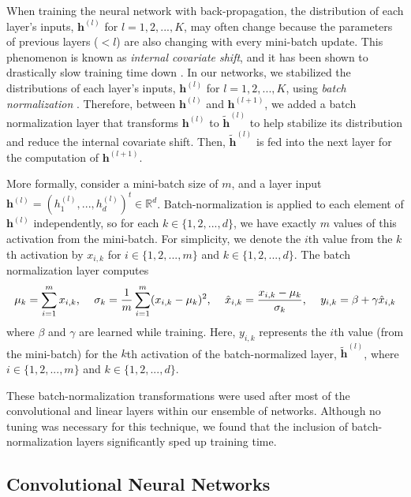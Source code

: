 \documentclass [MAS] {uclathes}
\begin{document}
When training the neural network with back-propagation, the distribution of each layer's inputs, $\mathbf{h}^{(l)}$ for $l=1, 2, ..., K$, may often change because the parameters of previous layers ($< l$) are also changing with every mini-batch update. This phenomenon is known as \textit{internal covariate shift}, and it has been shown to drastically slow training time down \cite{BatchNorm}. In our networks, we stabilized the distributions of each layer's inputs, $\mathbf{h}^{(l)}$ for $l=1, 2, ..., K$, using \textit{batch normalization} \cite{BatchNorm}. Therefore, between $\mathbf h^{(l)}$ and $\mathbf h^{(l+1)}$, we added a batch normalization layer that transforms $\mathbf{h}^{(l)}$ to $\tilde{\mathbf{h}}^{(l)}$ to help stabilize its distribution and reduce the internal covariate shift. Then, $\tilde{\mathbf{h}}^{(l)}$ is fed into the next layer for the computation of $\mathbf{h}^{(l+1)}$. 

More formally, consider a mini-batch size of $m$, and a layer input $\mathbf{h}^{(l)} = (h^{(l)}_1, ..., h^{(l)}_d)^t \in \mathbb{R}^d$. Batch-normalization is applied to each element of $\mathbf{h}^{(l)}$ independently, so for each $k \in \{1, 2, ..., d \}$, we have exactly $m$ values of this activation from the mini-batch. For simplicity, we denote the $i$th value from the $k$th activation by $x_{i,k}$ for $i \in \{1, 2, ..., m \}$ and $k \in \{1, 2, ..., d \}$. The batch normalization layer computes $$\mu_k = \sum_{i=1}^{m} x_{i, k} \text{, \quad} \sigma_k = \frac{1}{m} \sum_{i=1}^{m} (x_{i, k} - \mu_k)^2 \text{, \quad} \hat{x}_{i,k} = \frac{x_{i,k} - \mu_k}{\sigma_k} \text{, \quad} y_{i, k} = \beta + \gamma \hat{x}_{i,k}$$ where $\beta$ and $\gamma$ are learned while training. Here, $y_{i, k}$ represents the $i$th value (from the mini-batch) for the $k$th activation of the batch-normalized layer, $\tilde{\mathbf{h}}^{(l)}$, where $i \in \{1, 2, ..., m \}$ and $k \in \{1, 2, ..., d \}$.

These batch-normalization transformations were used after most of the convolutional and linear layers within our ensemble of networks. Although no tuning was necessary for this technique, we found that the inclusion of batch-normalization layers significantly sped up training time.


\subsection{Convolutional Neural Networks}
\end{document}
